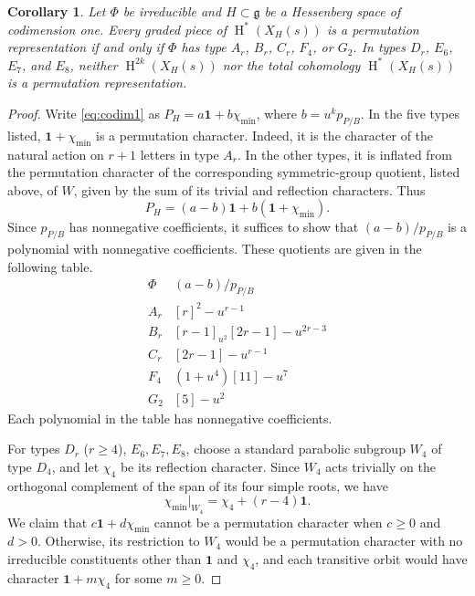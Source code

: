 \documentclass[11pt]{amsart}
\numberwithin{equation}{section}
\newtheorem{corollary}[theorem]{Corollary}
\theoremstyle{definition}
\DeclareMathOperator{\coh}{\mathrm{H}}
\def\fg{\mathfrak {g}}
\begin{document}
\begin{corollary}\label{cor:codim1:permutation}
Let $\Phi$ be irreducible and $H\subset\fg$ be a Hessenberg space of codimension one.
Every graded piece of $\coh^*(X_H(s))$ is a permutation representation if and only if $\Phi$ has type $A_r$, $B_r$, $C_r$, $F_4$, or $G_2$. 
In types $D_r$, $E_6$, $E_7$, and $E_8$, neither $\coh^{2k}(X_H(s))$ nor the total cohomology $\coh^*(X_H(s))$ is a permutation representation.
\end{corollary}
\begin{proof}
Write \eqref{eq:codim1} as $P_H=a\mathbf1+b\chi_{\min}$, where $b=u^kp_{P/B}$.
In the five types listed, $\mathbf1+\chi_{\min}$ is a permutation character.
Indeed, it is the character of the natural action on $r+1$ letters in type $A_r$.
In the other types, it is inflated from the permutation character of the corresponding symmetric-group quotient, listed above, of $W$, given by the sum of its trivial and reflection characters.
Thus
\[
P_H=(a-b)\mathbf1+b(\mathbf1+\chi_{\min}).
\]
Since $p_{P/B}$ has nonnegative coefficients, it suffices to show that $(a-b)/p_{P/B}$ is a polynomial with nonnegative coefficients.
These quotients are given in the following table.
\[
\begin{array}{c|l}
\Phi&(a-b)/p_{P/B}\\\hline
A_r&[r]^2-u^{r-1}\\
B_r&[r-1]_{u^2}[2r-1]-u^{2r-3}\\
C_r&[2r-1]-u^{r-1}\\
F_4&(1+u^4)[11]-u^7\\
G_2&[5]-u^2
\end{array}
\]
Each polynomial in the table has nonnegative coefficients.

For types $D_r$ ($r\geq4$), $E_6,E_7,E_8$, choose a standard parabolic subgroup $W_4$ of type $D_4$, and let $\chi_4$ be its reflection character. 
Since $W_4$ acts trivially on the orthogonal complement of the span of its four simple roots, we have
\[
\chi_{\min}|_{W_4}=\chi_4+(r-4)\mathbf1.
\]
We claim that $c\mathbf1+d\chi_{\min}$ cannot be a permutation character when $c\geq0$ and $d>0$.
Otherwise, its restriction to $W_4$ would be a permutation character with no irreducible constituents other than
$\mathbf1$ and $\chi_4$, and each transitive orbit would have character $\mathbf1+m\chi_4$ for some $m\geq0$.


\end{proof}
\end{document}
